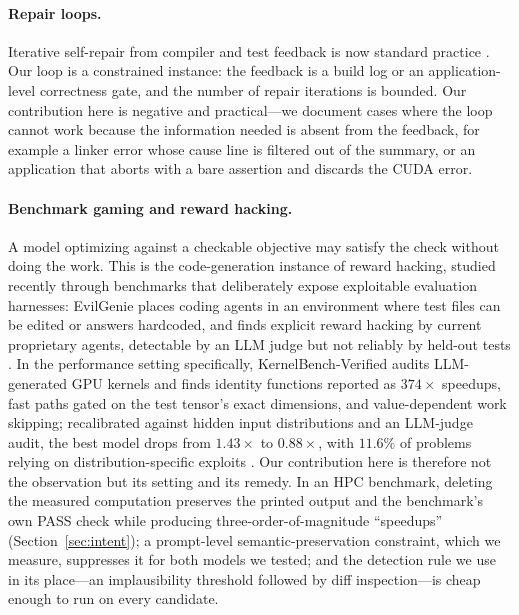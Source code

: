 \paragraph{Repair loops.}
Iterative self-repair from compiler and test feedback is now standard practice
\cite{chen2024selfdebug}. Our loop is a constrained instance: the feedback is a build log or an
application-level correctness gate, and the number of repair iterations is bounded. Our contribution
here is negative and practical---we document cases where the loop cannot work because the information
needed is absent from the feedback, for example a linker error whose cause line is filtered out of the
summary, or an application that aborts with a bare assertion and discards the CUDA error.

\paragraph{Benchmark gaming and reward hacking.}
A model optimizing against a checkable objective may satisfy the check without doing the work. This is
the code-generation instance of reward hacking, studied recently through benchmarks that deliberately
expose exploitable evaluation harnesses: EvilGenie places coding agents in an environment where
test files can be edited or answers hardcoded, and finds explicit reward hacking by current
proprietary agents, detectable by an LLM judge but not reliably by held-out tests
\cite{gabor2025evilgenie}. In the performance setting specifically, KernelBench-Verified audits
LLM-generated GPU kernels and finds identity functions reported as $374\times$ speedups, fast paths
gated on the test tensor's exact dimensions, and value-dependent work skipping; recalibrated against
hidden input distributions and an LLM-judge audit, the best model drops from $1.43\times$ to
$0.88\times$, with $11.6\%$ of problems relying on distribution-specific exploits
\cite{zhang2026kernelbenchverified}. Our contribution here is therefore not the observation but its
setting and its remedy.
In an HPC benchmark, deleting the measured computation preserves the printed output and the
benchmark's own PASS check while producing three-order-of-magnitude ``speedups''
(Section~\ref{sec:intent}); a prompt-level semantic-preservation constraint, which we measure,
suppresses it for both models we tested; and the detection rule we use in its place---an
implausibility threshold followed by diff inspection---is cheap enough to run on every candidate.

